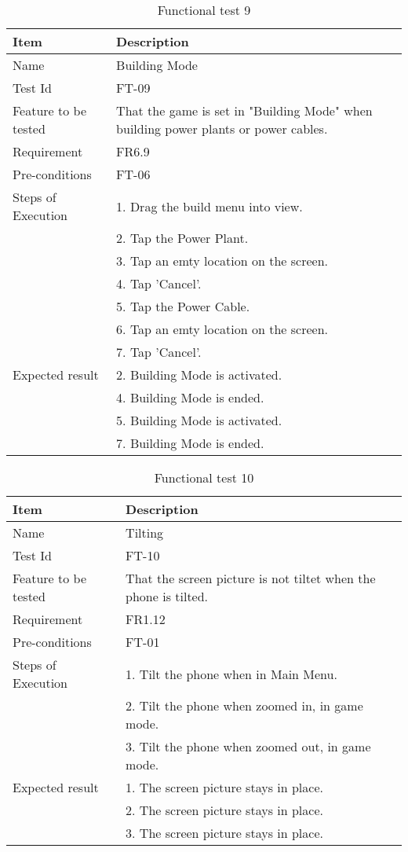\begin{table}[H]
\centering
	\begin{tabular}{ l | p{8cm} }
		\hline
		{\bf Item} & {\bf Description} \\ \hline
		Name & Building Mode \\ 
		Test Id & FT-09 \\ 
		Feature to be tested & That the game is set in "Building Mode" when building power plants or power cables. \\ 
		Requirement & FR6.9 \\ 
		Pre-conditions & FT-06 \\ 
		Steps of Execution & 1. Drag the build menu into view. \\ 
		& 2. Tap the Power Plant. \\
		& 3. Tap an emty location on the screen. \\
		& 4. Tap 'Cancel'. \\
		& 5. Tap the Power Cable. \\
		& 6. Tap an emty location on the screen. \\
		& 7. Tap 'Cancel'. \\
		Expected result & 2. Building Mode is activated. \\ 
		& 4. Building Mode is ended. \\
		& 5. Building Mode is activated. \\
		& 7. Building Mode is ended. \\
	\end{tabular}
	\caption{Functional test 9}
\end{table}

\begin{table}[H]
\centering
	\begin{tabular}{ l | p{8cm} }
		\hline
		{\bf Item} & {\bf Description} \\ \hline
		Name & Tilting \\ 
		Test Id & FT-10 \\ 
		Feature to be tested & That the screen picture is not tiltet when the phone is tilted. \\ 
		Requirement & FR1.12 \\ 
		Pre-conditions & FT-01 \\ 
		Steps of Execution & 1. Tilt the phone when in Main Menu. \\
		& 2. Tilt the phone when zoomed in, in game mode. \\
		& 3. Tilt the phone when zoomed out, in game mode. \\
		Expected result & 1. The screen picture stays in place. \\ 
		& 2. The screen picture stays in place. \\
		& 3. The screen picture stays in place. \\
	\end{tabular}
	\caption{Functional test 10}
\end{table}

